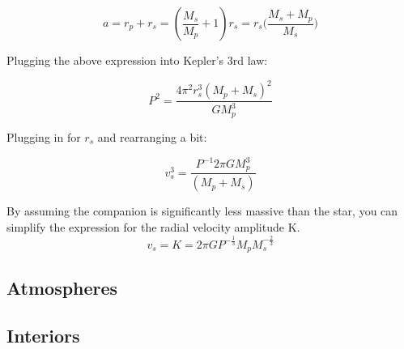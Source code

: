 \begin{equation}
a = r_p + r_s = (\frac{M_s}{M_p} + 1)r_s = r_s\big(\frac{M_s + M_p}{M_s}\big)
\end{equation}

Plugging the above expression into Kepler's 3rd law:

\begin{equation}
P^2 = \frac{4\pi^2r_s^3(M_p + M_s)^2}{GM_p^3}
\end{equation}

Plugging in for $r_s$ and rearranging a bit:

\begin{equation}
v_s^3 = \frac{P^{-1}2\pi GM_p^3}{(M_p + M_s)}
\end{equation}

By assuming the companion is significantly less massive than the star, you can simplify the expression for the radial velocity amplitude K.  
\begin{equation}
v_s = K = 2\pi G P^{-\frac{1}{3}}M_pM_s^{-\frac{2}{3}}
\end{equation}

\subsection{Atmospheres}
\subsection{Interiors}






